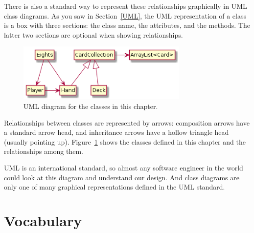 
There is also a standard way to represent these relationships graphically in UML class diagrams.
As you saw in Section~\ref{UML}, the UML representation of a class is a box with three sections: the class name, the attributes, and the methods.
The latter two sections are optional when showing relationships.


\begin{figure}[!ht]
\begin{center}
\includegraphics[width=0.75\textwidth]{figs/uml1.png}
\caption{UML diagram for the classes in this chapter.}
\label{fig.uml1}
\end{center}
\end{figure}

Relationships between classes are represented by arrows: composition arrows have a standard arrow head, and inheritance arrows have a hollow triangle head (usually pointing up).
Figure~\ref{fig.uml1} shows the classes defined in this chapter and the relationships among them.

UML is an international standard, so almost any software engineer in the world could look at this diagram and understand our design.
And class diagrams are only one of many graphical representations defined in the UML standard.


\section{Vocabulary}

